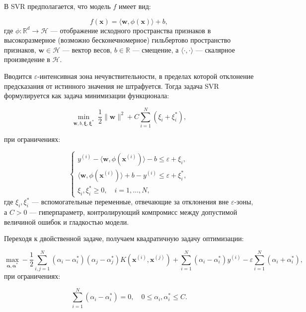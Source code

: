 В SVR предполагается, что модель $f$ имеет вид:

\begin{equation}
f(\mathbf{x}) = \langle \mathbf{w}, \phi(\mathbf{x}) \rangle + b,
\end{equation}
где $\phi: \mathbb{R}^d \to \mathcal{H}$ --- отображение исходного пространства признаков в высокоразмерное (возможно бесконечномерное) гильбертово пространство признаков, $\mathbf{w} \in \mathcal{H}$ --- вектор весов, $b \in \mathbb{R}$ — смещение, а $\langle \cdot, \cdot \rangle$ --- скалярное произведение в $\mathcal{H}$.

Вводится $\varepsilon$-интенсивная зона нечувствительности, в пределах которой отклонение предсказания от истинного значения не штрафуется. Тогда задача SVR формулируется как задача минимизации функционала:

\begin{equation}
\min_{\mathbf{w}, b, \boldsymbol{\xi}, \boldsymbol{\xi}^*} \; \frac{1}{2} \|\mathbf{w}\|^2 + C \sum_{i=1}^{N} (\xi_i + \xi_i^*),
\end{equation}

при ограничениях:

\begin{equation}
\begin{cases}
	y^{(i)} - \langle \mathbf{w}, \phi(\mathbf{x}^{(i)}) \rangle - b \leq \varepsilon + \xi_i, \\
	\langle \mathbf{w}, \phi(\mathbf{x}^{(i)}) \rangle + b - y^{(i)} \leq \varepsilon + \xi_i^*, \\
	\xi_i, \xi_i^* \geq 0, \quad i = 1, \ldots, N,
\end{cases}
\end{equation}
где $\xi_i, \xi_i^*$ --- вспомогательные переменные, отвечающие за отклонения вне $\varepsilon$-зоны, а $C > 0$ --- гиперпараметр, контролирующий компромисс между допустимой величиной ошибок и гладкостью модели.

Переходя к двойственной задаче, получаем квадратичную задачу оптимизации:

\begin{equation}
\max_{\boldsymbol{\alpha}, \boldsymbol{\alpha}^*} -\frac{1}{2} \sum_{i,j=1}^{N} (\alpha_i - \alpha_i^*)(\alpha_j - \alpha_j^*) K(\mathbf{x}^{(i)}, \mathbf{x}^{(j)}) + \sum_{i=1}^{N} (\alpha_i - \alpha_i^*) y^{(i)} - \varepsilon \sum_{i=1}^{N} (\alpha_i + \alpha_i^*),
\end{equation}
при ограничениях:

\begin{equation}
\sum_{i=1}^{N} (\alpha_i - \alpha_i^*) = 0, \quad 0 \leq \alpha_i, \alpha_i^* \leq C.
\end{equation}

